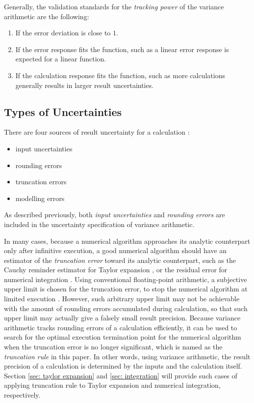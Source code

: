 \documentclass[twoside]{article}
\numberwithin{equation}{section}
\begin{document}
Generally, the validation standards for the \emph{tracking power} of the variance arithmetic are the following:
\begin{enumerate}
\item If the error deviation is close to $1$.

\item If the error response fits the function, such as a linear error response is expected for a linear function.

\item If the calculation response fits the function, such as more calculations generally results in larger result uncertainties.

\end{enumerate}


\subsection{Types of Uncertainties \cite{Prev_Precision_Arithmetic}}

There are four sources of result uncertainty for a calculation \cite{Statistical_Methods}\cite{Numerical_Recipes}:
\begin{itemize}
\item input uncertainties
\item rounding errors
\item truncation errors
\item modelling errors
\end{itemize}

As described previously, both \emph{input uncertainties} and \emph{rounding errors} are included in the uncertainty specification of variance arithmetic.

In many cases, because a numerical algorithm approaches its analytic counterpart only after infinitive execution, a good numerical algorithm should have an estimator of the \emph{truncation error} toward its analytic counterpart, such as the Cauchy reminder estimator for Taylor expansion \cite{Numerical_Recipes}, or the residual error for numerical integration \cite{Numerical_Recipes}.  
Using conventional floating-point arithmetic, a subjective upper limit is chosen for the truncation error, to stop the numerical algorithm at limited execution \cite{Numerical_Recipes}. 
However, such arbitrary upper limit may not be achievable with the amount of rounding errors accumulated during calculation, so that such upper limit may actually give a falsely small result precision. 
Because variance arithmetic tracks rounding errors of a calculation efficiently, it can be used to search for the optimal execution termination point for the numerical algorithm when the truncation error is no longer significant, which is named as the \emph{truncation rule} in this paper. In other words, using variance arithmetic, the result precision of a calculation is determined by the inputs and the calculation itself.  
Section \ref{sec: taylor expansion} and \ref{sec: integration} will provide such cases of applying truncation rule to Taylor expansion and numerical integration, respectively.
\end{document}
